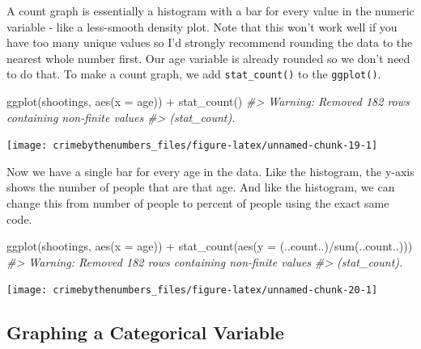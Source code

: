 \documentclass[
]{krantz}
\makeatletter
\newenvironment{Shaded}{\begin{snugshade}}{\end{snugshade}}
\newcommand{\AttributeTok}[1]{\textcolor[rgb]{0.61,0.61,0.61}{#1}}
\newcommand{\CommentTok}[1]{\textcolor[rgb]{0.37,0.37,0.37}{\textit{#1}}}
\newcommand{\FunctionTok}[1]{\textcolor[rgb]{0,0,0}{#1}}
\newcommand{\NormalTok}[1]{#1}
\newcommand{\SpecialCharTok}[1]{\textcolor[rgb]{0,0,0}{#1}}
\newenvironment{kframe}{%
\medskip{}
\setlength{\fboxsep}{.8em}
 \def\at@end@of@kframe{}%
 \ifinner\ifhmode%
  \def\at@end@of@kframe{\end{minipage}}%
  \begin{minipage}{\columnwidth}%
 \fi\fi%
 \def\FrameCommand##1{\hskip\@totalleftmargin \hskip-\fboxsep
 \colorbox{shadecolor}{##1}\hskip-\fboxsep
     \hskip-\linewidth \hskip-\@totalleftmargin \hskip\columnwidth}%
 \MakeFramed {\advance\hsize-\width
   \@totalleftmargin\z@ \linewidth\hsize
   \@setminipage}}%
 {\par\unskip\endMakeFramed%
 \at@end@of@kframe}
\renewenvironment{Shaded}{\begin{kframe}}{\end{kframe}}
\makeatother
\begin{document}
A count graph is essentially a histogram with a bar for every value in the numeric variable - like a less-smooth density plot. Note that this won't work well if you have too many unique values so I'd strongly recommend rounding the data to the nearest whole number first. Our age variable is already rounded so we don't need to do that. To make a count graph, we add \texttt{stat\_count()} to the \texttt{ggplot()}.

\begin{Shaded}
\begin{Highlighting}[]
\FunctionTok{ggplot}\NormalTok{(shootings, }\FunctionTok{aes}\NormalTok{(}\AttributeTok{x =}\NormalTok{ age)) }\SpecialCharTok{+} 
  \FunctionTok{stat\_count}\NormalTok{()}
\CommentTok{\#\textgreater{} Warning: Removed 182 rows containing non{-}finite values}
\CommentTok{\#\textgreater{} (stat\_count).}
\end{Highlighting}
\end{Shaded}

\begin{center}\texttt{[image: crimebythenumbers\_files/figure-latex/unnamed-chunk-19-1]} \end{center}

Now we have a single bar for every age in the data. Like the histogram, the y-axis shows the number of people that are that age. And like the histogram, we can change this from number of people to percent of people using the exact same code.

\begin{Shaded}
\begin{Highlighting}[]
\FunctionTok{ggplot}\NormalTok{(shootings, }\FunctionTok{aes}\NormalTok{(}\AttributeTok{x =}\NormalTok{ age)) }\SpecialCharTok{+} 
  \FunctionTok{stat\_count}\NormalTok{(}\FunctionTok{aes}\NormalTok{(}\AttributeTok{y =}\NormalTok{ (..count..)}\SpecialCharTok{/}\FunctionTok{sum}\NormalTok{(..count..)))}
\CommentTok{\#\textgreater{} Warning: Removed 182 rows containing non{-}finite values}
\CommentTok{\#\textgreater{} (stat\_count).}
\end{Highlighting}
\end{Shaded}

\begin{center}\texttt{[image: crimebythenumbers\_files/figure-latex/unnamed-chunk-20-1]} \end{center}

\hypertarget{graphing-a-categorical-variable}{%
\subsection{Graphing a Categorical Variable}\label{graphing-a-categorical-variable}}
\end{document}
